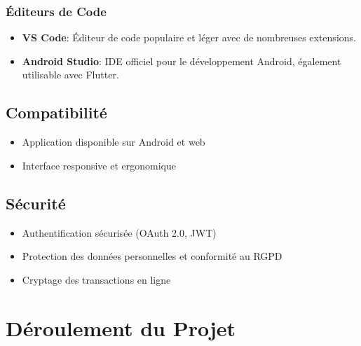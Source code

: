 \documentclass[12pt]{article}
\begin{document}
\subsubsection*{Éditeurs de Code}
\begin{itemize}
    \item \textbf{VS Code}: Éditeur de code populaire et léger avec de nombreuses extensions.
    \item \textbf{Android Studio}: IDE officiel pour le développement Android, également utilisable avec Flutter.
\end{itemize}

\subsection{Compatibilité}
\begin{itemize}
    \item Application disponible sur Android et web
    \item Interface responsive et ergonomique
\end{itemize}

\subsection{Sécurité}
\begin{itemize}
    \item Authentification sécurisée (OAuth 2.0, JWT)
    \item Protection des données personnelles et conformité au RGPD
    \item Cryptage des transactions en ligne
\end{itemize}

\section{Déroulement du Projet}
\end{document}
